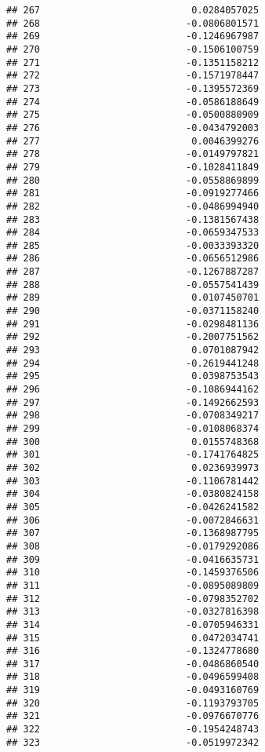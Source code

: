 \documentclass[
]{article}
\begin{document}
\begin{verbatim}
## 267                           0.0284057025
## 268                          -0.0806801571
## 269                          -0.1246967987
## 270                          -0.1506100759
## 271                          -0.1351158212
## 272                          -0.1571978447
## 273                          -0.1395572369
## 274                          -0.0586188649
## 275                          -0.0500880909
## 276                          -0.0434792003
## 277                           0.0046399276
## 278                          -0.0149797821
## 279                          -0.1028411849
## 280                          -0.0558869899
## 281                          -0.0919277466
## 282                          -0.0486994940
## 283                          -0.1381567438
## 284                          -0.0659347533
## 285                          -0.0033393320
## 286                          -0.0656512986
## 287                          -0.1267887287
## 288                          -0.0557541439
## 289                           0.0107450701
## 290                          -0.0371158240
## 291                          -0.0298481136
## 292                          -0.2007751562
## 293                           0.0701087942
## 294                          -0.2619441248
## 295                           0.0398753543
## 296                          -0.1086944162
## 297                          -0.1492662593
## 298                          -0.0708349217
## 299                          -0.0108068374
## 300                           0.0155748368
## 301                          -0.1741764825
## 302                           0.0236939973
## 303                          -0.1106781442
## 304                          -0.0380824158
## 305                          -0.0426241582
## 306                          -0.0072846631
## 307                          -0.1368987795
## 308                          -0.0179292086
## 309                          -0.0416635731
## 310                          -0.1459376506
## 311                          -0.0895089809
## 312                          -0.0798352702
## 313                          -0.0327816398
## 314                          -0.0705946331
## 315                           0.0472034741
## 316                          -0.1324778680
## 317                          -0.0486860540
## 318                          -0.0496599408
## 319                          -0.0493160769
## 320                          -0.1193793705
## 321                          -0.0976670776
## 322                          -0.1954248743
## 323                          -0.0519972342

\end{verbatim}
\end{document}
